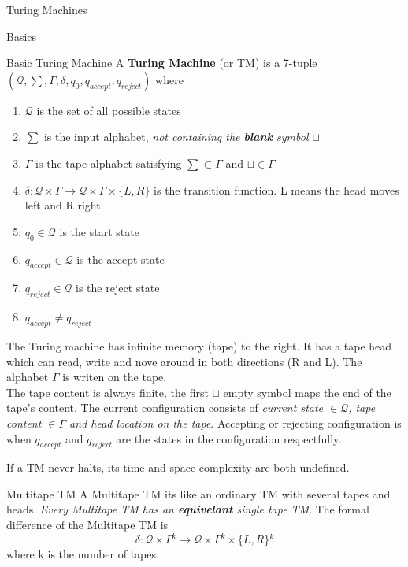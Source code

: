 \documentclass[12pt, letterpaper]{article}
\begin{document}
\begin{section}{Turing Machines}

  \begin{subsection}{Basics}

    \begin{subsubsection}{Basic Turing Machine}
      A \textbf{Turing Machine} (or TM) is a 7-tuple
      \((\mathcal{Q}, \sum, \Gamma, \delta, q_{0}, q_{accept}, q_{reject})\) where
      \begin{enumerate}
        \item \(\mathcal{Q}\) is the set of all possible states
        \item \(\sum\) is the input alphabet, \textit{not containing the \textbf{blank} symbol \(\sqcup\)}
        \item \(\Gamma\) is the tape alphabet satisfying \(\sum \subset \Gamma\) and \(\sqcup \in \Gamma\)
        \item \(\delta: \mathcal{Q} \times \Gamma \to \mathcal{Q} \times \Gamma \times \{{} L, R \}{}\)
              is the transition function. L means the head moves left and R right.
        \item \(q_{0} \in \mathcal{Q}\) is the start state
        \item \(q_{accept} \in \mathcal{Q}\) is the accept state
        \item \(q_{reject} \in \mathcal{Q}\) is the reject state
        \item \(q_{accept} \neq q_{reject}\)
      \end{enumerate}

      The Turing machine has infinite memory (tape) to the right. It has a tape head which
      can read, write and nove around in both directions (R and L). The alphabet \(\Gamma\)
      is writen on the tape. \\
      The tape content is always finite, the first \(\sqcup\) empty symbol maps the end of
      the tape's content. The current configuration consists of
      \emph{current state \(\in \mathcal{Q}\), tape content \(\in \Gamma\) and head location on the tape}.
      Accepting or rejecting configuration is when \(q_{accept}\) and \(q_{reject}\)
      are the states in the configuration respectfully.

      If a TM never halts, its time and space complexity are both undefined.
    \end{subsubsection}

    \begin{subsubsection}{Multitape TM}
      A Multitape TM its like an ordinary TM with several tapes and heads.
      \emph{Every Multitape TM has an \textbf{equivelant} single tape TM}.
      The formal difference of the Multitape TM is
      \[\delta: \mathcal{Q} \times \Gamma^{k} \to \mathcal{Q} \times \Gamma^{k} \times \{{} L, R \}{}^{k}\]
      where k is the number of tapes.


\end{subsubsection}
\end{subsection}
\end{section}
\end{document}
